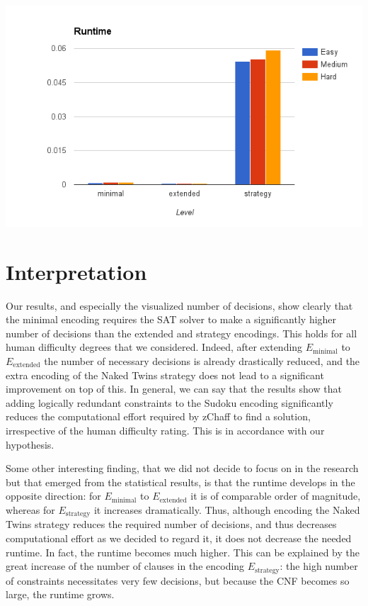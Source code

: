 \documentclass[10pt,a4paper,leqno]{article}
\begin{document}
\includegraphics[scale=0.5]{chart_runtime.png}

 

\section*{Interpretation}


Our results, and especially the visualized number of decisions, show clearly that the minimal encoding requires the SAT solver to make a significantly higher number of decisions than the extended and strategy encodings. This holds for all human difficulty degrees that we considered. Indeed, after extending $E_{\text{minimal}}$ to $E_{\text{extended}}$ the number of necessary decisions is already drastically reduced, and the extra encoding of the Naked Twins strategy does not lead to a significant improvement on top of this. In general, we can say that the results show that adding logically redundant constraints to the Sudoku encoding significantly reduces the computational effort required by zChaff to find a solution, irrespective of the human difficulty rating. This is in accordance with our hypothesis. 

Some other interesting finding, that we did not decide to focus on in the research but that emerged from the statistical results, is that the runtime develops in the opposite direction: for $E_{\text{minimal}}$ to $E_{\text{extended}}$ it is of comparable order of magnitude, whereas for $E_{\text{strategy}}$ it increases dramatically. Thus, although encoding the Naked Twins strategy reduces the required number of decisions, and thus decreases computational effort as we decided to regard it, it does not decrease the needed runtime. In fact, the runtime becomes much higher. This can be explained by the great increase of the number of clauses in the encoding  $E_{\text{strategy}}$: the high number of constraints necessitates very few decisions, but because the CNF becomes so large, the runtime grows. 
\end{document}
